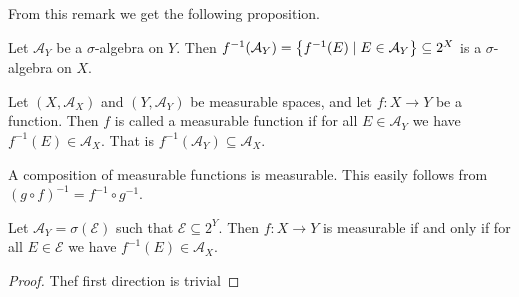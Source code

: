 \documentclass[11pt,a4paper]{article}
\newcommand{\A}{\mathcal A}
\begin{document}
From this remark we get the following proposition.

\begin{proposition}
  Let $\A_Y$ be a $\sigma$-algebra on $Y$.
  Then $f^{-1}(\A_Y) = \set{f^{-1}(E) \mid E \in \A_Y} \subseteq 2^X$
  is a $\sigma$-algebra on $X$.
\end{proposition}

\begin{definition}
  Let $(X, \A_X)$ and $(Y, \A_Y)$ be measurable spaces,
  and let $f \colon X \to Y$ be a function.
  Then $f$ is called a measurable function if for all $E \in \A_Y$ we
  have $f^{-1}(E) \in \A_X$.
  That is $f^{-1}(\A_Y) \subseteq \A_X$.
\end{definition}

\begin{remark}
  A composition of measurable functions is measurable.
  This easily follows from $(g \circ f)^{-1} = f^{-1} \circ g^{-1}$.
\end{remark}

\begin{lemma}
  Let $\A_Y = \sigma(\mathcal E)$ such that $\mathcal E \subseteq 2^{Y}$.
  Then $f \colon X \to Y$ is measurable if and only if for all
  $E \in \mathcal E$ we have $f^{-1}(E) \in \A_X$.
\end{lemma}
\begin{proof}
  Thef first direction is trivial
\end{proof}




\end{document}
